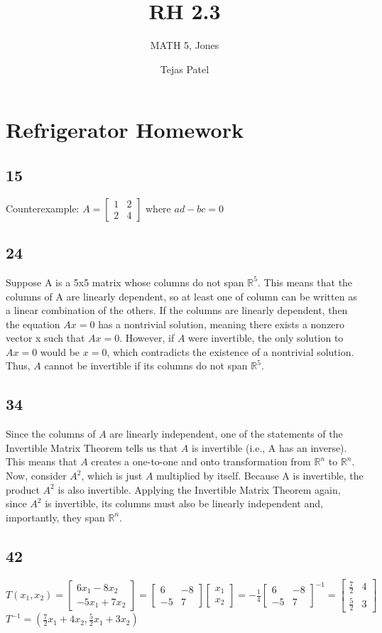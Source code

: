 \documentclass{article}
\title{RH 2.3}
\author{MATH 5, Jones}
\date{Tejas Patel}
\begin{document}
\maketitle
\section*{Refrigerator Homework}
\subsection*{15}
Counterexample: $A=\begin{bmatrix}1&2\\2&4\end{bmatrix}$ where $ad-bc=0$
\subsection*{24}
Suppose A is a 5x5 matrix whose columns do not span $\mathbb{R}^5$. This means that the columns of A are linearly dependent, so at least one of column can be written as a linear combination of the others.
If the columns are linearly dependent, then the equation $Ax=0$ has a nontrivial solution, meaning there exists a nonzero vector x such that $Ax=0$.
However, if $A$ were invertible, the only solution to $Ax=0$ would be $x=0$, which contradicts the existence of a nontrivial solution. Thus, $A$ cannot be invertible if its columns do not span $\mathbb{R}^5$.
\subsection*{34}
Since the columns of $A$ are linearly independent, one of the statements of the Invertible Matrix Theorem tells us that $A$ is invertible (i.e., A has an inverse). This means that $A$ creates a one-to-one and onto transformation from $\mathbb{R}^n$ to $\mathbb{R}^n$. Now, consider $A^2$, which is just $A$ multiplied by itself. Because A is invertible, the product $A^2$ is also invertible. Applying the Invertible Matrix Theorem again, since $A^2$ is invertible, its columns must also be linearly independent and, importantly, they span $\mathbb{R}^n$.
\subsection*{42}
$T(x_1,x_2)=\begin{bmatrix}6x_1-8x_2\\-5x_1+7x_2\end{bmatrix} = \begin{bmatrix}6&-8\\-5&7\end{bmatrix}\begin{bmatrix}x_1\\x_2\end{bmatrix} = -\frac{1}{4} \begin{bmatrix}6&-8\\-5&7\end{bmatrix}^{-1}=\begin{bmatrix}\frac{7}{2} & 4 \\[0.1in] \frac{5}{2} & 3\end{bmatrix}$
\\$T^{-1}=\left(\frac{7}{2}x_1+4x_2, \frac{5}{2}x_1+3x_2\right)$
\pagebreak
\end{document}
